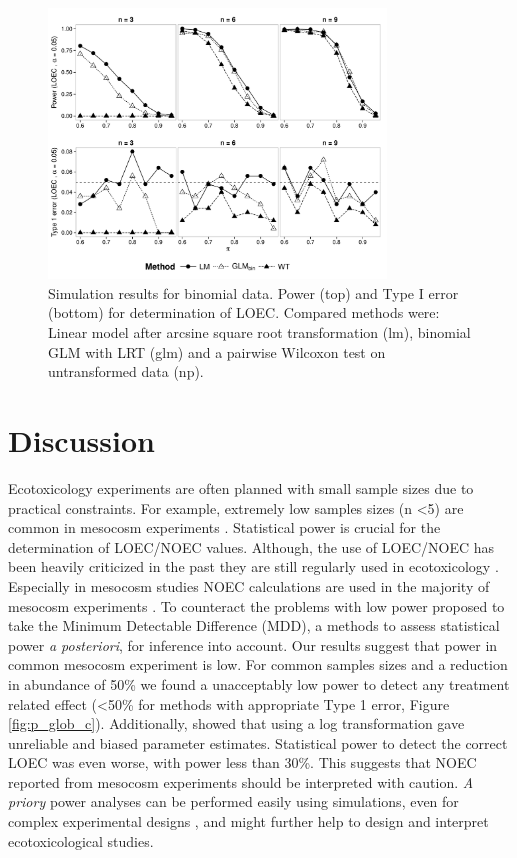 \documentclass{scrartcl}
\begin{document}
\begin{figure}[h]
  \centering
  \includegraphics[width = 0.8\textwidth]{p_loec_p.pdf}
  \caption{Simulation results for binomial data. Power (top) and Type I error (bottom) for determination of LOEC. Compared methods were: Linear model after arcsine square root transformation (lm), binomial GLM with LRT (glm) and a pairwise Wilcoxon test on untransformed data (np).}
  \label{fig:p_loec_p}
\end{figure}



\newpage
\section{Discussion}

Ecotoxicology experiments are often planned with small sample sizes due to practical constraints. 
For example, extremely low samples sizes (n \textless 5) are common in mesocosm experiments \citep{sanderson_pesticide_2002,szocs_analysing_2015}.
Statistical power is crucial for the determination of LOEC/NOEC values.
Although, the use of LOEC/NOEC has been heavily criticized in the past \citep{landis_well_2011}  they are still regularly used in ecotoxicology \citep{jager_bad_2012}.
Especially in mesocosm studies NOEC calculations are used in the majority of mesocosm experiments \citep{brock_minimum_2014,efsa_ppr_guidance_2013}.
To counteract the problems with low power \citet{brock_minimum_2014} proposed to take the Minimum Detectable Difference (MDD), a methods to assess statistical power \emph{a posteriori}, for inference into account.
Our results suggest that power in common mesocosm experiment is low.
For common samples sizes and a reduction in abundance of 50\% we found a unacceptably low power to detect any treatment related effect (\textless 50\% for methods with appropriate Type 1 error, Figure \ref{fig:p_glob_c}).
Additionally, \citet{ohara_not_2010} showed that using a log transformation gave unreliable and biased parameter estimates.
Statistical power to detect the correct LOEC was even worse, with power less than 30\%.
This suggests that NOEC reported from mesocosm experiments should be interpreted with caution. 
\emph{A priory} power analyses can be performed easily using simulations, even for complex experimental designs \citep{johnson_power_2014}, and might further help to design and interpret ecotoxicological studies.
\end{document}

